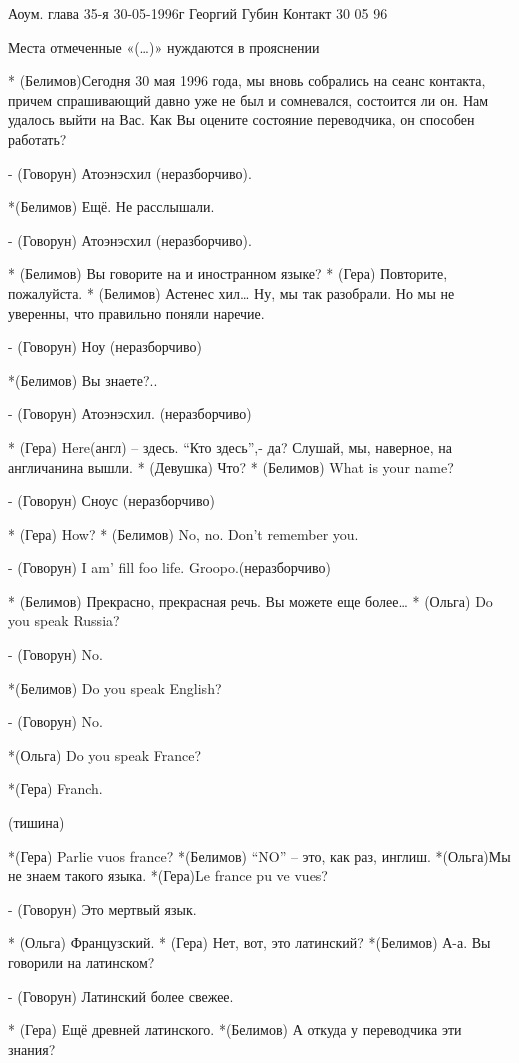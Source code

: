 Аоум. глава 35-я 30-05-1996г
Георгий Губин
Контакт 30 05 96


Места отмеченные «(…)» 
нуждаются в прояснении  

* (Белимов)Сегодня 30 мая 1996 года, мы вновь собрались на сеанс контакта, причем спрашивающий давно уже не был и сомневался, состоится ли он. Нам удалось выйти на Вас. Как Вы оцените состояние переводчика, он способен работать?

- (Говорун) Атоэнэсхил (неразборчиво).

*(Белимов) Ещё. Не расслышали.

- (Говорун) Атоэнэсхил (неразборчиво).

* (Белимов) Вы говорите на и иностранном языке?
* (Гера) Повторите, пожалуйста.
* (Белимов)  Астенес хил… Ну, мы так разобрали. Но мы не уверенны, что правильно поняли наречие.

- (Говорун) Ноу (неразборчиво)

*(Белимов) Вы знаете?..

- (Говорун) Атоэнэсхил. (неразборчиво)

* (Гера) Here(англ) – здесь. “Кто здесь”,- да? Слушай, мы, наверное, на англичанина вышли.
* (Девушка) Что?
* (Белимов) What  is your name?

- (Говорун) Сноус (неразборчиво)

* (Гера) How?
* (Белимов) No, no. Don't remember you.

- (Говорун) I am’ fill foo life. Groopo.(неразборчиво)

* (Белимов) Прекрасно, прекрасная речь. Вы можете еще более…
* (Ольга) Do you speak Russia?

- (Говорун) No.

*(Белимов) Do you speak English?

- (Говорун) No.

*(Ольга) Do you speak France?

*(Гера) Franch.

(тишина)

*(Гера) Parlie vuos france?
 *(Белимов) “NO” – это, как раз, инглиш.
*(Ольга)Мы не знаем такого языка.
*(Гера)Le france pu ve vues?

- (Говорун) Это мертвый язык.

* (Ольга) Французский.
* (Гера) Нет, вот, это латинский?
*(Белимов) А-а. Вы говорили на латинском?

- (Говорун) Латинский более свежее.

* (Гера) Ещё древней латинского.
*(Белимов) А откуда у переводчика эти знания?

